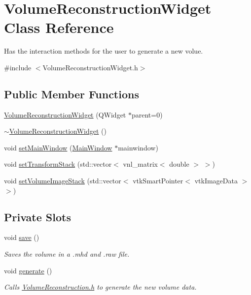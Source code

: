 \hypertarget{class_volume_reconstruction_widget}{\section{Volume\-Reconstruction\-Widget Class Reference}
\label{d5/d55/class_volume_reconstruction_widget}
}


Has the interaction methods for the user to generate a new volue.  




{\ttfamily \#include $<$Volume\-Reconstruction\-Widget.\-h$>$}

\subsection*{Public Member Functions}
\begin{DoxyCompactItemize}
\item 
\hyperlink{class_volume_reconstruction_widget_a416775ea7aaf4825ac221175748d4a44}{Volume\-Reconstruction\-Widget} (Q\-Widget $\ast$parent=0)
\item 
\hyperlink{class_volume_reconstruction_widget_a3405f6a602f58f56a00eb3931832c244}{$\sim$\-Volume\-Reconstruction\-Widget} ()
\item 
void \hyperlink{class_volume_reconstruction_widget_af052a30a68972c3d864268afdf4a9b01}{set\-Main\-Window} (\hyperlink{class_main_window}{Main\-Window} $\ast$mainwindow)
\item 
void \hyperlink{class_volume_reconstruction_widget_a4a6309c14e9dc0b56a4d2e5037f6ded7}{set\-Transform\-Stack} (std\-::vector$<$ vnl\-\_\-matrix$<$ double $>$ $>$)
\item 
void \hyperlink{class_volume_reconstruction_widget_a748ad3f117a04950da1e46eda4d5f763}{set\-Volume\-Image\-Stack} (std\-::vector$<$ vtk\-Smart\-Pointer$<$ vtk\-Image\-Data $>$ $>$)
\end{DoxyCompactItemize}
\subsection*{Private Slots}
\begin{DoxyCompactItemize}
\item 
void \hyperlink{class_volume_reconstruction_widget_a610fbb01abf2c0a69c143304233170ac}{save} ()
\begin{DoxyCompactList}\small\item\em Saves the volume in a .mhd and .raw file. \end{DoxyCompactList}\item 
void \hyperlink{class_volume_reconstruction_widget_a65ed7b767a7e256539b4f4cdeebe8a3f}{generate} ()
\begin{DoxyCompactList}\small\item\em Calls \hyperlink{_volume_reconstruction_8h}{Volume\-Reconstruction.\-h} to generate the new volume data. \end{DoxyCompactList}\end{DoxyCompactItemize}
